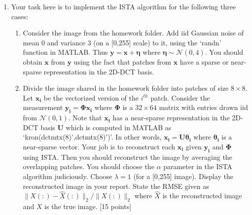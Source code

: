\documentclass[11pt]{article}
\begin{document}
\begin{enumerate}
\item Your task here is to implement the ISTA algorithm for the following three cases:
\begin{enumerate}
\item Consider the image from the homework folder. Add iid Gaussian noise of mean 0 and variance 3 (on a [0,255] scale) to it, using the `randn' function in MATLAB. Thus $\boldsymbol{y} = \boldsymbol{x} + \boldsymbol{\eta}$ where $\boldsymbol{\eta} \sim \mathcal{N}(0,4)$. You should obtain $\boldsymbol{x}$ from $\boldsymbol{y}$ using the fact that patches from $\boldsymbol{x}$ have a sparse or near-sparse representation in the 2D-DCT basis. 
\item Divide the image shared in the homework folder into patches of size $8 \times 8$. Let $\boldsymbol{x_i}$ be the vectorized version of the $i^{th}$ patch. Consider the measurement $\boldsymbol{y_i} = \boldsymbol{\Phi x_i}$ where $\boldsymbol{\Phi}$ is a $32 \times 64$ matrix with entries drawn iid from $\mathcal{N}(0,1)$. Note that $\boldsymbol{x_i}$ has a near-sparse representation in the 2D-DCT basis $\boldsymbol{U}$ which is computed in MATLAB as `kron(dctmtx(8)',dctmtx(8)')'. In other words, $\boldsymbol{x_i} = \boldsymbol{U \theta_i}$ where $\boldsymbol{\theta_i}$ is a near-sparse vector. Your job is to reconstruct each $\boldsymbol{x_i}$ given $\boldsymbol{y_i}$ and $\boldsymbol{\Phi}$ using ISTA. Then you should reconstruct the image by averaging the overlapping patches. You should choose the $\alpha$ parameter in the ISTA algorithm judiciously. Choose $\lambda = 1$ (for a [0,255] image). Display the reconstructed image in your report. State the RMSE given as $\|X(:)-\hat{X}(:)\|_2/\|X(:)\|_2$ where $\hat{X}$ is the reconstructed image and $X$ is the true image. \textsf{[15 points]}
\end{enumerate}


\end{enumerate}
\end{document}
